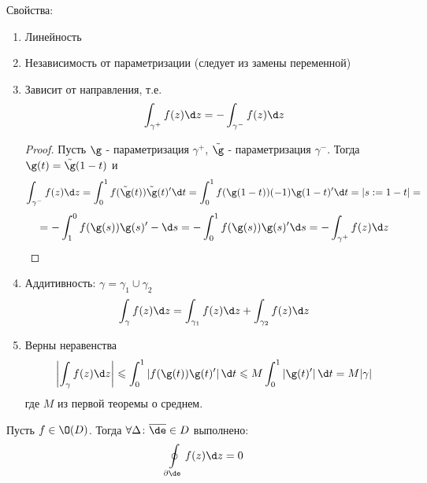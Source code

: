 Свойства:
\begin{enumerate}
  \item Линейность
  \item Независимость от параметризации (следует из замены переменной)
  \item Зависит от направления, т.е.
  \[\int_{\gamma^+}f(z)\d z = - \int_{\gamma^-}f(z)\d z\]
  \begin{proof}
    Пусть $\g$ - параметризация $\gamma^+$, $\tilde{\g}$ - параметризация $\gamma^-$. Тогда $\g(t)=\tilde{\g}(1-t)$ и 
    \[\int_{\gamma^-}f(z)\d z = \int_{0}^{1}f(\tilde{\g}(t))\tilde{\g}(t)'\d t=\int_{0}^{1}f(\g(1-t))(-1)\g(1-t)'\d t = |s:=1-t|=\]
    \[=-\int_{1}^{0}f(\g(s))\g(s)'-\d s = -\int_{0}^{1}f(\g(s))\g(s)'\d s= - \int_{\gamma^+}f(z)\d z\]
  \end{proof}
  \item Аддитивность: $\gamma = \gamma_1\cup \gamma_2$
  \[\int_{\gamma}f(z)\d z = \int_{\gamma_1}f(z)\d z + \int_{\gamma_2}f(z)\d z\]
  \item Верны неравенства 
  \[\left|\int_{\gamma}f(z)\d z\right|\leqslant \int_{0}^{1}\left|f(\g(t))\g(t)'\right|\d t\leqslant M \int_{0}^{1}\left|\g(t)'\right|\d t= M |\gamma|\]
  где $M$ из первой теоремы о среднем. 
\end{enumerate}
\begin{theorem}[(Гурса)]
  Пусть $f\in\O(D)$. Тогда $\forall \Delta\colon \overline{\de} \in D$ выполнено:
  \[\oint\limits_{\partial\de}f(z)\d z=0\]
\end{theorem}

